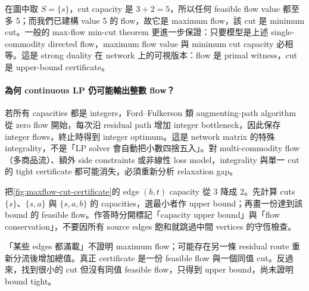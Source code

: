 \documentclass[11pt,a4paper,oneside,openany]{book}
\begin{document}
在圖中取 $S=\{s\}$，cut capacity 是 $3+2=5$，所以任何 feasible flow value 都至多 5；而我們已建構 value 5 的 flow，故它是 maximum flow，該 cut 是 minimum cut。一般的 max-flow min-cut theorem 更進一步保證：只要模型是上述 single-commodity directed flow，maximum flow value 與 minimum cut capacity 必相等。這是 strong duality 在 network 上的可視版本：flow 是 primal witness，cut 是 upper-bound certificate。

\paragraph{為何 continuous LP 仍可能輸出整數 flow？}
若所有 capacities 都是 integers，Ford--Fulkerson 類 augmenting-path algorithm 從 zero flow 開始，每次沿 residual path 增加 integer bottleneck，因此保存 integer flows，終止時得到 integer optimum。這是 network matrix 的特殊 integrality，不是「LP solver 會自動把小數四捨五入」。對 multi-commodity flow（多商品流）、額外 side constraints 或非線性 loss model，integrality 與單一 cut 的 tight certificate 都可能消失，必須重新分析 relaxation gap。

\begin{example}
把\cref{fig:maxflow-cut-certificate}的 edge $(b,t)$ capacity 從 3 降成 2。先計算 cuts $\{s\}$、$\{s,a\}$ 與 $\{s,a,b\}$ 的 capacities，選最小者作 upper bound；再畫一份達到該 bound 的 feasible flow。作答時分開標記「capacity upper bound」與「flow conservation」，不要因所有 source edges 飽和就跳過中間 vertices 的守恆檢查。
\end{example}

\begin{misconception}
「某些 edges 都滿載」不證明 maximum flow；可能存在另一條 residual route 重新分流後增加總值。真正 certificate 是一份 feasible flow 與一個同值 cut。反過來，找到很小的 cut 但沒有同值 feasible flow，只得到 upper bound，尚未證明 bound tight。
\end{misconception}
\end{document}
